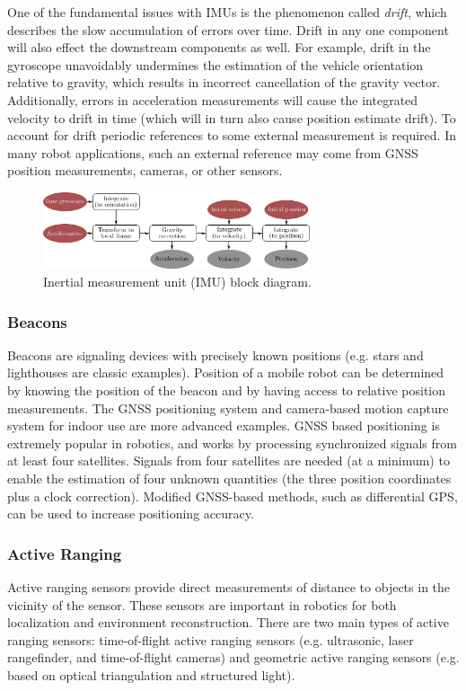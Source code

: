 One of the fundamental issues with IMUs is the phenomenon called \textit{drift}, which describes the slow accumulation of errors over time. Drift in any one component will also effect the downstream components as well. For example, drift in the gyroscope unavoidably undermines the estimation of the vehicle orientation relative to gravity, which results in incorrect cancellation of the gravity vector. Additionally, errors in acceleration measurements will cause the integrated velocity to drift in time (which will in turn also cause position estimate drift). To account for drift periodic references to some external measurement is required. In many robot applications, such an external reference may come from GNSS position measurements, cameras, or other sensors.

\begin{figure}[ht]
    \centering
        \includegraphics[width=0.7\textwidth]{tex/figs/ch07_figs/imu.png}
      \caption{Inertial measurement unit (IMU) block diagram.}
    \label{fig:IMU}
\end{figure}

\subsubsection{Beacons}
Beacons are signaling devices with precisely known positions (e.g. stars and lighthouses are classic examples). Position of a mobile robot can be determined by knowing the position of the beacon and by having access to relative position measurements. The GNSS positioning system and camera-based motion capture system for indoor use are more advanced examples. GNSS based positioning is extremely popular in robotics, and works by processing synchronized signals from at least four satellites. Signals from four satellites are needed (at a minimum) to enable the estimation of four unknown quantities (the three position coordinates plus a clock correction). Modified GNSS-based methods, such as differential GPS, can be used to increase positioning accuracy.

\subsubsection{Active Ranging}
Active ranging sensors provide direct measurements of distance to objects in the vicinity of the sensor. These sensors are important in robotics for both localization and environment reconstruction. There are two main types of active ranging sensors: time-of-flight active ranging sensors (e.g. ultrasonic, laser rangefinder, and time-of-flight cameras) and geometric active ranging sensors (e.g. based on optical triangulation and structured light).

